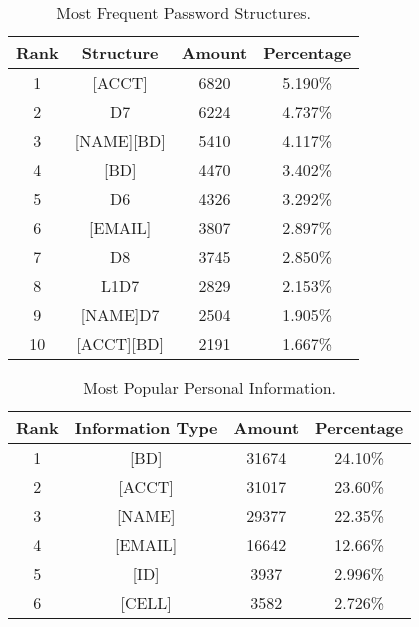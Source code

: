 \begin{table}
\centering
\caption{Most Frequent Password Structures.}
\begin{tabular}{|c|c|c|c|} \hline
Rank&Structure&Amount&Percentage\\ \hline
1&[ACCT]&6820&5.190\%\\
2&D7&6224&4.737\%\\
3&[NAME][BD]&5410&4.117\%\\
4&[BD]&4470&3.402\%\\
5&D6&4326&3.292\%\\
6&[EMAIL]&3807&2.897\%\\
7&D8&3745&2.850\%\\
8&L1D7&2829&2.153\%\\
9&[NAME]D7&2504&1.905\%\\
10&[ACCT][BD]&2191&1.667\%\\
\hline\end{tabular}
\label{t3}
\end{table}

\begin{table}
\centering
\caption{Most Popular Personal Information.}
\begin{tabular}{|c|c|c|c|} \hline
Rank&Information Type&Amount&Percentage\\ \hline
1&[BD]&31674&24.10\%\\
2&[ACCT]&31017&23.60\%\\
3&[NAME]&29377&22.35\%\\
4&[EMAIL]&16642&12.66\%\\
5&[ID]&3937&2.996\%\\
6&[CELL]&3582&2.726\%\\
\hline\end{tabular}
\label{t4}
\end{table}

